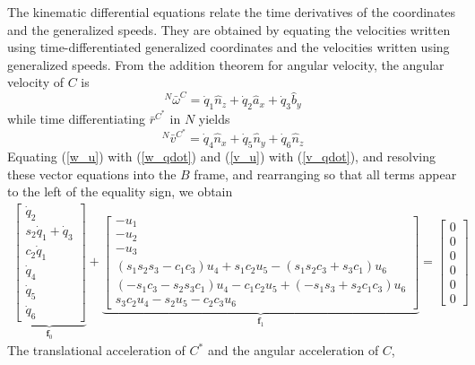 \documentclass[smallcondensed,final]{svjour3}                     %
\begin{document}
The kinematic differential equations relate the time derivatives of the
coordinates and the generalized speeds. They are obtained by equating the
velocities written using time-differentiated generalized coordinates and the
velocities written using generalized speeds. From the addition theorem for
angular velocity, the angular velocity of $C$ is
\begin{equation}
  \label{w_qdot}
  {^N}\bar{\omega}^C = \dot{q}_1 \hat{n}_z + \dot{q}_2 \hat{a}_x + \dot{q}_3 \hat{b}_y
\end{equation}
while time differentiating $\bar{r}^{C^*}$ in $N$ yields
\begin{equation}
  \label{v_qdot}
  {^N}\bar{v}^{C^*} = \dot{q}_4 \hat{n}_x + \dot{q}_5 \hat{n}_y + \dot{q}_6 \hat{n}_z
\end{equation}
Equating (\ref{w_u}) with (\ref{w_qdot}) and (\ref{v_u}) with (\ref{v_qdot}),
and resolving these vector equations into the $B$ frame, and rearranging so
that all terms appear to the left of the equality sign, we obtain
\begin{align}
    \label{rd:f_0_f_1}
\underbrace{\left[\begin{matrix}\dot{q}_{2}\\s_2
    \dot{q}_{1} + \dot{q}_{3}\\ c_2
    \dot{q}_{1}\\\dot{q}_{4}\\\dot{q}_{5}\\\dot{q}_{6}\end{matrix}\right]}_{\mathbf{f}_0}
    +
\underbrace{\left[\begin{matrix}- u_{1}\\- u_{2}\\- u_{3}\\
\left(s_1 s_2 s_3 - c_1c_3\right)u_4 +
s_1 c_2 u_5 - \left(s_1 s_2c_3 +
s_3c_1\right)u_6 \\
%
\left(-s_1c_3 - s_2 s_3c_1\right)u_4 -
c_1c_2 u_5 +
\left(-s_1 s_3 + s_2c_1c_3\right)u_6
\\
%
s_3c_2u_4  - s_2u_5 - c_2c_3u_6
\end{matrix}\right]}_{\mathbf{f}_1}
    = \left[\begin{matrix} 0\\ 0\\ 0\\ 0\\ 0\\ 0\end{matrix}\right]
\end{align}
The translational acceleration of $C^*$ and the angular acceleration of $C$,
\end{document}
